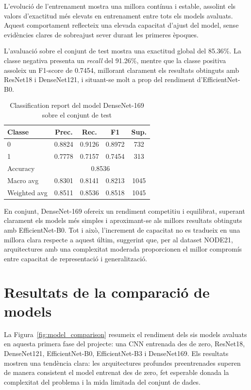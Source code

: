 \documentclass[conference]{IEEEtran}
\begin{document}
L’evolució de l’entrenament mostra una millora contínua i estable, assolint els valors
d’exactitud més elevats en entrenament entre tots els models avaluats. Aquest
comportament reflecteix una elevada capacitat d’ajust del model, sense evidències
clares de sobreajust sever durant les primeres èpoques.

L’avaluació sobre el conjunt de test mostra una exactitud global del 85.36\%. La classe
negativa presenta un \textit{recall} del 91.26\%, mentre que la classe positiva assoleix un
F1-score de 0.7454, millorant clarament els resultats obtinguts amb ResNet18 i
DenseNet121, i situant-se molt a prop del rendiment d’EfficientNet-B0.

\begin{table}[H]
\caption{Classification report del model DenseNet-169 sobre el conjunt de test}
\label{tab:classification_report_densenet169}
\centering
\footnotesize
\setlength{\tabcolsep}{3pt}
\begin{tabular}{lcccc}
\toprule
\textbf{Classe} & \textbf{Prec.} & \textbf{Rec.} & \textbf{F1} & \textbf{Sup.} \\
\midrule
0 & 0.8824 & 0.9126 & 0.8972 & 732 \\
1 & 0.7778 & 0.7157 & 0.7454 & 313 \\
\midrule
Accuracy     & \multicolumn{4}{c}{0.8536} \\
Macro avg    & 0.8301 & 0.8141 & 0.8213 & 1045 \\
Weighted avg & 0.8511 & 0.8536 & 0.8518 & 1045 \\
\bottomrule
\end{tabular}
\end{table}

En conjunt, DenseNet-169 ofereix un rendiment competitiu i equilibrat, superant
clarament els models més simples i aproximant-se als millors resultats obtinguts amb
EfficientNet-B0. Tot i això, l’increment de capacitat no es tradueix en una millora clara
respecte a aquest últim, suggerint que, per al dataset NODE21, arquitectures amb una
complexitat moderada proporcionen el millor compromís entre capacitat de
representació i generalització.


\section{Resultats de la comparació de models}

La Figura~\ref{fig:model_comparison} resumeix el rendiment dels sis models avaluats
en aquesta primera fase del projecte: una CNN entrenada des de zero, ResNet18,
DenseNet121, EfficientNet-B0, EfficientNet-B3 i DenseNet169. Els resultats mostren
una tendència clara: les arquitectures profundes preentrenades superen de manera
consistent el model entrenat des de zero, fet esperable donada la complexitat del
problema i la mida limitada del conjunt de dades.
\end{document}
